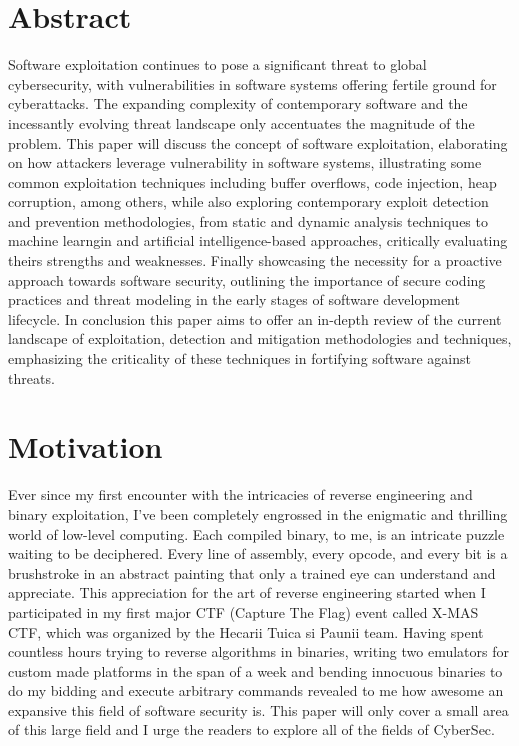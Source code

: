 \documentclass{article}
\begin{document}
\section{Abstract}%

Software exploitation continues to pose a significant threat to global
cybersecurity, with vulnerabilities in software systems offering fertile ground
for cyberattacks. The expanding complexity of contemporary software and the
incessantly evolving threat landscape only accentuates the magnitude of the
problem. This paper will discuss the concept of software exploitation,
elaborating on how attackers leverage vulnerability in software systems,
illustrating some common exploitation techniques including buffer overflows,
code injection, heap corruption, among others, while also exploring contemporary
exploit detection and prevention methodologies, from static and dynamic analysis
techniques to machine learngin and artificial intelligence-based approaches,
critically evaluating theirs strengths and weaknesses. Finally showcasing the
necessity for a proactive approach towards software security, outlining the
importance of secure coding practices and threat modeling in the early stages of
software development lifecycle. In conclusion this paper aims to offer an
in-depth review of the current landscape of exploitation, detection and
mitigation methodologies and techniques, emphasizing the criticality of these
techniques in fortifying software against threats.

\section{Motivation}%

Ever since my first encounter with the intricacies of reverse engineering and
binary exploitation, I've been completely engrossed in the enigmatic and
thrilling world of low-level computing. Each compiled binary, to me, is an
intricate puzzle waiting to be deciphered. Every line of assembly, every opcode,
and every bit is a brushstroke in an abstract painting that only a trained eye
can understand and appreciate. This appreciation for the art of reverse
engineering started when I participated in my first major CTF (Capture The Flag)
event called X-MAS CTF, which was organized by the Hecarii Tuica si Paunii team.
Having spent countless hours trying to reverse algorithms in binaries, writing
two emulators for custom made platforms in the span of a week and bending
innocuous binaries to do my bidding and execute arbitrary commands revealed to
me how awesome an expansive this field of software security is. This paper will
only cover a small area of this large field and I urge the readers to explore
all of the fields of CyberSec.
\end{document}
